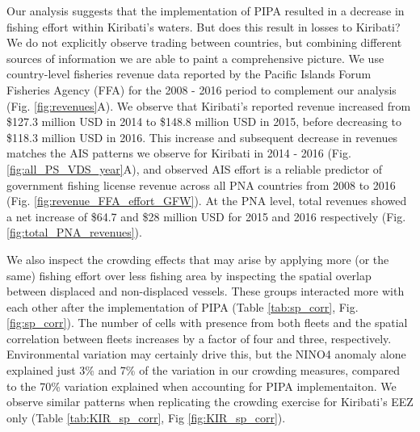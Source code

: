 \documentclass[12pt]{article}
\begin{document}
Our analysis suggests that the implementation of PIPA resulted in a decrease in fishing effort within Kiribati's waters. But does this result in losses to Kiribati? We do not explicitly observe trading between countries, but combining different sources of information we are able to paint a comprehensive picture. We use country-level fisheries revenue data reported by the Pacific Islands Forum Fisheries Agency (FFA) for the 2008 - 2016 period to complement our analysis (Fig. \ref{fig:revenues}A). We observe that Kiribati's reported revenue increased from \$127.3 million USD in 2014 to \$148.8 million USD in 2015, before decreasing to \$118.3 million USD in 2016. This increase and subsequent decrease in revenues matches the AIS patterns we observe for Kiribati in 2014 - 2016 (Fig. \ref{fig:all_PS_VDS_year}A), and observed AIS effort is a reliable predictor of government fishing license revenue across all PNA countries from 2008 to 2016 (Fig. \ref{fig:revenue_FFA_effort_GFW}). At the PNA level, total revenues showed a net increase of \$64.7 and \$28 million USD for 2015 and 2016 respectively (Fig. \ref{fig:total_PNA_revenues}).

We also inspect the crowding effects that may arise by applying more (or the same) fishing effort over less fishing area by inspecting the spatial overlap between displaced and non-displaced vessels. These groups interacted more with each other after the implementation of PIPA (Table \ref{tab:sp_corr}, Fig. \ref{fig:sp_corr}). The number of cells with presence from both fleets and the spatial correlation between fleets increases by a factor of four and three, respectively. Environmental variation may certainly drive this, but the NINO4 anomaly alone explained just 3\% and 7\% of the variation in our crowding measures, compared to the 70\% variation explained when accounting for PIPA implementaiton. We observe similar patterns when replicating the crowding exercise for Kiribati's EEZ only (Table \ref{tab:KIR_sp_corr}, Fig \ref{fig:KIR_sp_corr}).
\end{document}
